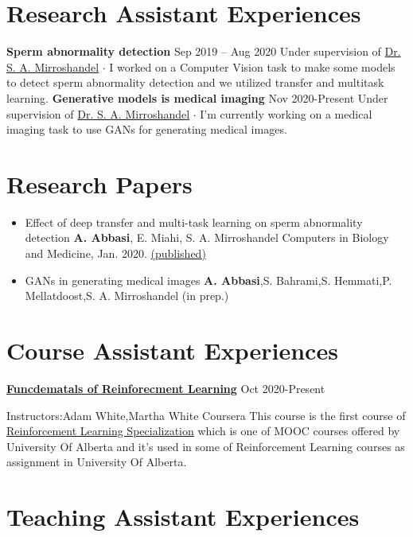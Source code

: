 \documentclass[paper=a4,fontsize=11pt]{scrartcl} %
\newcommand{\NewPart}[1]{\section*{{#1}}}
\begin{document}
\NewPart{Research Assistant Experiences}
\textbf{Sperm abnormality detection} \hfill Sep 2019 – Aug 2020 \newline
Under supervision of \href{https://staff.guilan.ac.ir/mirroshandel/?lg=1}{Dr. S. A. Mirroshandel} \newline
$\cdot$ \footnotesize  I worked on a Computer Vision task to make some models to detect sperm abnormality detection and we utilized transfer and multitask learning. \newline
\newline
\textbf{Generative models is medical imaging} \hfill Nov 2020-Present \newline
Under supervision of \href{https://staff.guilan.ac.ir/mirroshandel/?lg=1}{Dr. S. A. Mirroshandel} \newline
$\cdot$ \footnotesize  I'm currently working on a medical imaging task to use GANs for generating medical images.

\NewPart{Research Papers}
\begin{itemize}

\item Effect of deep transfer and multi-task learning on sperm abnormality detection \newline
\textbf{A. Abbasi}, E. Miahi, S. A. Mirroshandel \newline
Computers in Biology and Medicine, Jan. 2020. \href{https://www.sciencedirect.com/science/article/pii/S0010482520304522}{(published)}

\item GANs in generating medical images \newline
\textbf{A. Abbasi},S. Bahrami,S. Hemmati,P. Mellatdoost,S. A. Mirroshandel (in prep.)
\end{itemize}


\NewPart{Course Assistant Experiences} 

\textbf{ \href{https://www.coursera.org/learn/fundamentals-of-reinforcement-learning}{Funcdematals of Reinforecment Learning}} \footnotesize \hfill Oct 2020-Present
\begin{itemize}
\footnotesize Instructors:Adam White,Martha White \hfill Coursera \newline 
\newline
\footnotesize{This course is the first course of \href{https://www.coursera.org/specializations/reinforcement-learning}{\underline{Reinforcement Learning Specialization}} which is one of MOOC courses offered by University Of Alberta and it's used in some of Reinforcement Learning courses as assignment in University Of Alberta.}
\end{itemize}
\NewPart{Teaching Assistant Experiences}
\end{document}
